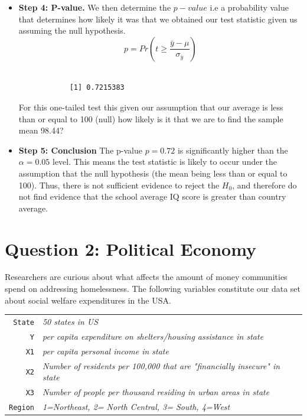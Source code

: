 \documentclass[12pt,letterpaper]{article}
\begin{document}
\begin{itemize}
		\begin{verbatim}
			[1] -0.5957439
		\end{verbatim}
	\item \textbf{Step 4: P-value. } We then determine the $p-value$ i.e  a probability value that determines how likely it was that we obtained our test statistic given us assuming the null hypothesis.
		\begin{equation}
			p = Pr(t \ge \frac{\bar{y}-\mu}{\sigma_{\bar{y}}})
		\end{equation} \
		\ 
		\begin{verbatim}
			[1] 0.7215383
		\end{verbatim}
	 For this one-tailed test this given our assumption that our average is less than or equal to 100 (null) how likely is it that we are to find the sample mean 98.44?
	\item \textbf{Step 5: Conclusion } The p-value $p = 0.72$ is significantly higher than the $\alpha=0.05$ level. This means the test statistic is likely to occur under the assumption that the null hypothesis (the mean being less than or equal to 100). Thus,  there is not sufficient evidence to reject the $H_0$, and therefore do not find evidence that the school average IQ score is greater than country average. 
\end{itemize}

\newpage

	\section*{Question 2: Political Economy}

\noindent Researchers are curious about what affects the amount of money communities spend on addressing homelessness. The following variables constitute our data set about social welfare expenditures in the USA. \\
\vspace{.5cm}


\begin{tabular}{r|l}
	\texttt{State} &\emph{50 states in US} \\
	\texttt{Y} & \emph{per capita expenditure on shelters/housing assistance in state}\\
	\texttt{X1} &\emph{per capita personal income in state} \\
	\texttt{X2} &  \emph{Number of residents per 100,000 that are "financially insecure" in state}\\
	\texttt{X3} &  \emph{Number of people per thousand residing in urban areas in state} \\
	\texttt{Region} &  \emph{1=Northeast, 2= North Central, 3= South, 4=West} \\
\end{tabular}
\end{document}
